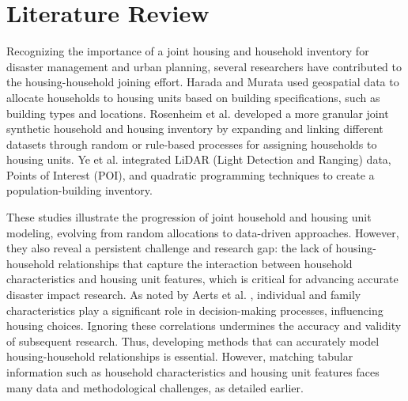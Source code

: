 \section{Literature Review}
Recognizing the importance of a joint housing and household inventory for disaster management and urban planning, several researchers have contributed to the housing-household joining effort. Harada and Murata \cite{harada2017projecting} used geospatial data to allocate households to housing units based on building specifications, such as building types and locations. Rosenheim et al. \cite{rosenheim2021integration} developed a more granular joint synthetic household and housing inventory by expanding and linking different datasets through random or rule-based processes for assigning households to housing units. Ye et al. \cite{ye2024enhancing} integrated LiDAR (Light Detection and Ranging) data, Points of Interest (POI), and quadratic programming techniques to create a population-building inventory. 

These studies illustrate the progression of joint household and housing unit modeling, evolving from random allocations to data-driven approaches. However, they also reveal a persistent challenge and research gap: the lack of housing-household relationships that capture the interaction between household characteristics and housing unit features, which is critical for advancing accurate disaster impact research. As noted by Aerts et al. \cite{aerts2018integrating}, individual and family characteristics play a significant role in decision-making processes, influencing housing choices. Ignoring these correlations undermines the accuracy and validity of subsequent research. Thus, developing methods that can accurately model housing-household relationships is essential. However, matching tabular information such as household characteristics and housing unit features faces many data and methodological challenges, as detailed earlier. 

